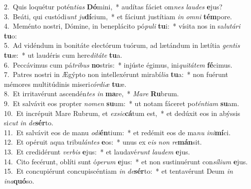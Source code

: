 {2.~}Quis loquétur potén\textit{ti}\textit{as} \textbf{Dó}mini,~* audítas fáciet om\textit{nes} \textit{lau}\textit{des} \textbf{e}jus?\\
{3.~}Beáti, qui custódi\textit{unt} \textit{ju}\textbf{dí}cium,~* et fáciunt justítiam \textit{in} \textit{om}\textit{ni} \textbf{tém}pore.\\
{4.~}Meménto nostri, Dómine, in beneplácito pó\textit{pu}\textit{li} \textbf{tu}i:~* vísita nos in sa\textit{lu}\textit{tá}\textit{ri} \textbf{tu}o:\\
{5.~}Ad vidéndum in bonitáte electórum tuórum, ad lætándum in lætítia \textit{gen}\textit{tis} \textbf{tu}æ:~* ut laudéris cum here\textit{di}\textit{tá}\textit{te} \textbf{tu}a.\\
{6.~}Peccávimus cum pá\textit{tri}\textit{bus} \textbf{no}stris:~* injúste égimus, ini\textit{qui}\textit{tá}\textit{tem} \textbf{fé}cimus.\\
{7.~}Patres nostri in Ægýpto non intellexérunt mirabí\textit{li}\textit{a} \textbf{tu}a:~* non fuérunt mémores multitúdinis miseri\textit{cór}\textit{di}\textit{æ} \textbf{tu}æ.\\
{8.~}Et irritavérunt ascendén\textit{tes} \textit{in} \textbf{ma}re,~* \textit{Ma}\textit{re} \textbf{Ru}brum.\\
{9.~}Et salvávit eos propter \textit{no}\textit{men} \textbf{su}um:~* ut notam fáceret po\textit{tén}\textit{ti}\textit{am} \textbf{su}am.\\
{10.~}Et incrépuit Mare Rubrum, et \textit{ex}\textit{sic}\textbf{cá}tum est,~* et dedúxit eos in abýssis si\textit{cut} \textit{in} \textit{de}\textbf{sér}to.\\
{11.~}Et salvávit eos de manu \textit{o}\textit{di}\textbf{én}tium:~* et redémit eos de ma\textit{nu} \textit{i}\textit{ni}\textbf{mí}ci.\\
{12.~}Et opéruit aqua tribu\textit{lán}\textit{tes} \textbf{e}os:~* unus ex e\textit{is} \textit{non} \textit{re}\textbf{mán}sit.\\
{13.~}Et credidérunt \textit{ver}\textit{bis} \textbf{e}jus:~* et laudavé\textit{runt} \textit{lau}\textit{dem} \textbf{e}jus.\\
{14.~}Cito fecérunt, oblíti sunt ó\textit{pe}\textit{rum} \textbf{e}jus:~* et non sustinuérunt con\textit{sí}\textit{li}\textit{um} \textbf{e}jus.\\
{15.~}Et concupiérunt concupiscéntiam \textit{in} \textit{de}\textbf{sér}to:~* et tentavérunt Deum \textit{in} \textit{i}\textit{na}\textbf{quó}so.\\
